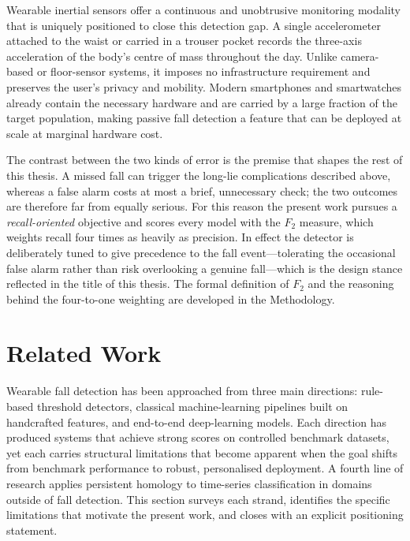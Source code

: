 \documentclass[onluarkali,ingilizce,yukseklisans,karton,LisansustuEgitim]{itutez}
\providecommand{\1}{\mathbf{1}}
\begin{document}
Wearable inertial sensors offer a continuous and unobtrusive monitoring modality that
is uniquely positioned to close this detection gap.  A single accelerometer attached
to the waist or carried in a trouser pocket records the three-axis acceleration of the
body's centre of mass throughout the day.  Unlike camera-based or floor-sensor systems,
it imposes no infrastructure requirement and preserves the user's privacy and mobility.
Modern smartphones and smartwatches already contain the necessary hardware and are
carried by a large fraction of the target population, making passive fall detection a
feature that can be deployed at scale at marginal hardware cost.

The contrast between the two kinds of error is the premise that shapes the rest of
this thesis. A missed fall can trigger the long-lie complications described above,
whereas a false alarm costs at most a brief, unnecessary check; the two outcomes are
therefore far from equally serious. For this reason the present work pursues a
\emph{recall-oriented} objective and scores every model with the $F_2$ measure, which
weights recall four times as heavily as precision. In effect the detector is
deliberately tuned to give precedence to the fall event---tolerating the occasional
false alarm rather than risk overlooking a genuine fall---which is the design stance
reflected in the title of this thesis. The formal definition of $F_2$ and the reasoning
behind the four-to-one weighting are developed in the Methodology.

\section{Related Work}
\label{sec:related}

Wearable fall detection has been approached from three main directions: rule-based
threshold detectors, classical machine-learning pipelines built on handcrafted
features, and end-to-end deep-learning models.  Each direction has produced systems
that achieve strong scores on controlled benchmark datasets, yet each carries
structural limitations that become apparent when the goal shifts from benchmark
performance to robust, personalised deployment.  A fourth line of research applies
persistent homology to time-series classification in domains outside of fall detection.
This section surveys each strand, identifies the specific limitations that motivate
the present work, and closes with an explicit positioning statement.
\end{document}
